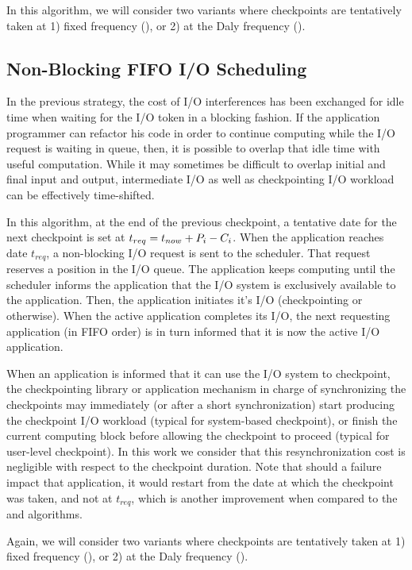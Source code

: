 In this algorithm, we will consider two variants where checkpoints are
tentatively taken at 1) fixed frequency (\bfifofixed), or 2) at the
Daly frequency (\bfifodaly).

\subsection{Non-Blocking \fifononblock FIFO I/O Scheduling}

In the previous strategy, the cost of I/O interferences has been
exchanged for idle time when waiting for the I/O token in a blocking
fashion. If the application programmer can refactor his code in order
to continue computing while the I/O request is waiting in queue,
then, it is possible to overlap that idle time with useful computation.
While it may sometimes be difficult to overlap initial and final input
and output, intermediate I/O as well as checkpointing I/O workload can
be effectively time-shifted.

In this algorithm, at the end of the previous checkpoint, a tentative
date for the next checkpoint is set at $t_{req}=t_{now}+P_{i}-C_{i}$.
When the application reaches date $t_{req}$, a non-blocking I/O request
is sent to the scheduler. That request reserves a position in the
I/O queue. The application keeps computing until the
scheduler informs the application that the I/O system is exclusively
available to the application. Then, the application initiates it's
I/O (checkpointing or otherwise). When the active application completes
its I/O, the next requesting application (in FIFO order) is in turn
informed that it is now the active I/O application.

When an application is informed that it can use the I/O system to
checkpoint, the checkpointing library or application mechanism
in charge of synchronizing the checkpoints may immediately (or after
a short synchronization) start producing the checkpoint I/O workload
(typical for system-based checkpoint),
or finish the current computing block before allowing the checkpoint
to proceed (typical for user-level checkpoint). In this work we consider
that this resynchronization cost is negligible with respect to the
checkpoint duration. Note that should a failure impact that application,
it would restart from the date at which the checkpoint was taken, and
not at $t_{req}$, which is another improvement when compared to the
\fifoblock and \nocoop algorithms.

Again, we will consider two variants where checkpoints are
tentatively taken at 1) fixed frequency (\fifofixed), or 2) at the
Daly frequency (\fifodaly).

